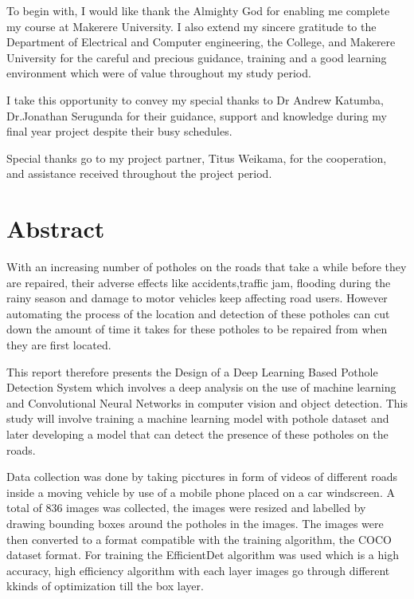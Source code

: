 \documentclass[12pt]{report}
\begin{document}
To begin with, I would like thank the Almighty God for enabling me complete my course at Makerere University. I also extend my sincere gratitude to the Department of Electrical and Computer engineering, the College, and Makerere University for the careful and precious guidance, training and a good learning environment which were of value throughout my study period.

I take this opportunity to convey my special thanks to Dr Andrew Katumba, Dr.Jonathan Serugunda  for their guidance, support and knowledge during my final year project despite their busy schedules.

Special thanks go to my project partner, Titus Weikama, for the cooperation, and assistance received throughout the project period.







\newpage



\section*{Abstract}


With an increasing number of  potholes on the roads that take a while before they are repaired, their adverse effects like accidents,traffic jam, flooding during the rainy season and damage to motor vehicles keep affecting road users. However automating the process of the location and detection of these potholes can cut down the amount of time it takes for these potholes to be repaired from when they are first located.

This report therefore presents the Design of a Deep Learning  Based Pothole Detection System which involves a deep analysis on the use of machine learning and Convolutional Neural Networks in computer vision and object detection. This study will involve training a machine learning model with pothole dataset and later developing a model that can detect the presence of these potholes on the roads.

Data collection was done by taking picctures in form of videos of different roads inside a moving vehicle by use of a mobile phone placed on a car windscreen. A total of 836 images was collected, the images were resized and labelled by drawing bounding boxes around the potholes in the images. The images were then converted to a format compatible with the training algorithm, the COCO dataset format. For training the EfficientDet algorithm was used which is a high accuracy, high efficiency algorithm with each layer images go through different kkinds of optimization till the box layer.
\end{document}
